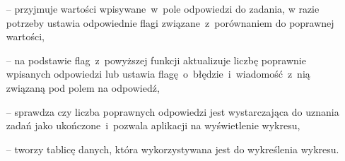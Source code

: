 \begin{itemize}
  \item [--]  przyjmuje wartości wpisywane~w~pole odpowiedzi do zadania, w
        razie potrzeby ustawia odpowiednie flagi związane~z~porównaniem do poprawnej wartości,
  \item [--]  na podstawie flag~z~powyższej funkcji aktualizuje liczbę
        poprawnie wpisanych odpowiedzi lub ustawia flagę~o~błędzie~i~wiadomość~z~nią związaną pod
        polem na odpowiedź,
  \item [--]  sprawdza czy liczba poprawnych odpowiedzi jest wystarczająca
        do uznania zadań jako ukończone~i~pozwala aplikacji na wyświetlenie wykresu,
  \item [--]  tworzy tablicę danych, która wykorzystywana jest do
        wykreślenia wykresu.
\end{itemize}
